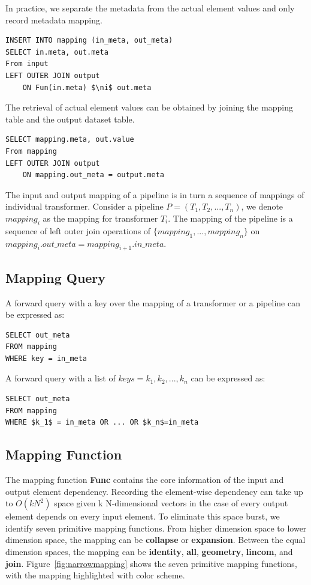 \documentclass{sig-alternate}
\begin{document}
In practice, we separate the metadata from the actual element values and only record metadata mapping.
\begin{lstlisting}
INSERT INTO mapping (in_meta, out_meta)
SELECT in.meta, out.meta
From input
LEFT OUTER JOIN output 
    ON Fun(in.meta) $\ni$ out.meta
\end{lstlisting}
The retrieval of actual element values can be obtained by joining the mapping table and the output dataset table.
\begin{lstlisting}
SELECT mapping.meta, out.value
From mapping
LEFT OUTER JOIN output 
    ON mapping.out_meta = output.meta
\end{lstlisting}

The input and output mapping of a pipeline is in turn a sequence of mappings of individual transformer.
Consider a pipeline $P=(T_1, T_2, ..., T_n)$, we denote $mapping_i$ as the mapping for transformer $T_i$.
The mapping of the pipeline is a sequence of left outer join operations of $\{mapping_1, ..., mapping_n\}$ on 
$mapping_i.out\_meta = mapping_{i+1}.in\_meta$.

\subsection{Mapping Query}
A forward query with a key over the mapping of a transformer or a pipeline can be expressed as:
\begin{lstlisting}
SELECT out_meta
FROM mapping
WHERE key = in_meta
\end{lstlisting}

A forward query with a list of $keys={k_1, k_2, ..., k_n}$ can be expressed as:
\begin{lstlisting}
SELECT out_meta
FROM mapping
WHERE $k_1$ = in_meta OR ... OR $k_n$=in_meta
\end{lstlisting}

\subsection{Mapping Function}
\label{sec:Map-Func}
The mapping function {\bf Func} contains the core information of the input and output element dependency.
Recording the element-wise dependency can take up to $O(kN^2)$ space given k N-dimensional vectors in the case
of every output element depends on every input element. 
To eliminate this space burst, we identify seven primitive mapping functions.
From higher dimension space to lower dimension space, the mapping can be {\bf collapse} or {\bf expansion}.
Between the equal dimension spaces, the mapping can be {\bf identity}, {\bf all}, {\bf geometry}, {\bf lincom}, and {\bf join}.
Figure~\ref{fig:narrowmapping} shows the seven primitive mapping functions, with the mapping highlighted with color scheme.
\end{document}
